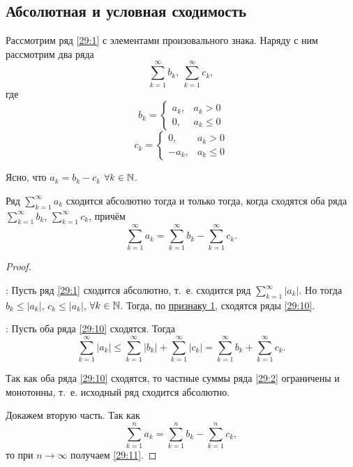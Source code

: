 \documentclass[../../main.tex]{subfiles}
\begin{document}
	\subsection{Абсолютная и условная сходимость}
	
	Рассмотрим ряд \eqref{29:1} с элементами произовального знака. Наряду с ним 
	рассмотрим два ряда 
	\begin{equation}
		\sum\limits_{k = 1}^\infty b_k,\ \sum\limits_{k = 1}^\infty c_k,
		\label{29:10}
	\end{equation} 
	где
	\[b_k = \begin{cases}
		a_k,& a_{k} > 0\\
		0,& a_{k}\leq0
	\end{cases}\]
	\[c_k = \begin{cases}
		0,& a_{k} > 0\\
		-a_k,& a_{k}\leq 0
	\end{cases}\]
	
	Ясно, что $a_k = b_k - c_k$ $\forall k\in\mathbb{N}$.
	
	\begin{thm}\label{29:absolute_conv}
		Ряд $\sum\limits_{k = 1}^\infty a_k$ сходится абсолютно 
		тогда и только тогда, когда сходятся оба ряда 
		$\sum\limits_{k = 1}^\infty b_k$, $\sum\limits_{k = 1}^\infty c_k$, 
		причём
		\begin{equation}
			\sum_{k = 1}^\infty a_k = \sum_{k = 1}^\infty b_k - \sum_{k = 1}^\infty c_k.
			\label{29:11}
		\end{equation}
	\end{thm}
	\begin{proof}
		~
		
		\nec: Пусть ряд \eqref{29:1} сходится 
		абсолютно, т.~е. сходится ряд $\sum\limits_{k = 1}^\infty |a_k|$.
		Но тогда $b_k\leq |a_k|$, $c_k\leq |a_k|$, $\forall k\in\mathbb{N}$. 
		Тогда, по \hyperref[lec26:comp_test_1]{признаку 1\textdegree}, 
		сходятся ряды \eqref{29:10}.
		
		\suff: Пусть оба ряда \eqref{29:10} сходятся. 
		Тогда
		\[\sum_{k = 1}^\infty |a_k|\leq \sum_{k = 1}^\infty |b_k| + 
		\sum_{k = 1}^\infty|c_k| = \sum_{k = 1}^\infty b_k + 
		\sum_{k = 1}^\infty c_k.\]
		
		Так как оба ряда \eqref{29:10} сходятся, 
		то частные суммы ряда \eqref{29:2} ограничены и монотонны, т.~е. исходный 
		ряд сходится абсолютно.
		
		Докажем вторую часть. Так как 
		\[\sum_{k = 1}^n a_k = \sum_{k = 1}^n b_k - \sum_{k = 1}^n c_k,\]
		то при $n\to\infty$ получаем \eqref{29:11}.
	\end{proof}
\end{document}
